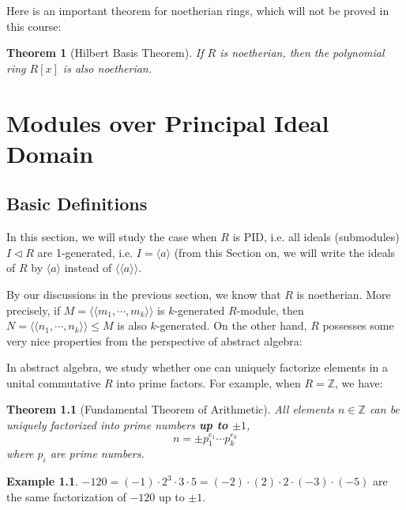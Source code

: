 \documentclass[11pt,openany]{book}
\theoremstyle{plain}
\newtheorem{theorem}{Theorem}[chapter]
\theoremstyle{definition}
\newtheorem{example}[example]{Example}
\theoremstyle{remark}
\begin{document}
Here is an important theorem for noetherian rings, which will not be proved in this course:
\begin{theorem} [Hilbert Basis Theorem]
    If $R$ is noetherian, then the polynomial ring $R[x]$ is also noetherian.
\end{theorem}


\chapter{Modules over Principal Ideal Domain}
\section{Basic Definitions}
In this section, we will study the case when $R$ is PID, i.e. all ideals (submodules) $I\lhd R$ are 1-generated, i.e. $I=\langle a \rangle$ (from this Section on, we will write the ideals of $R$ by $\langle a \rangle$ instead of $\langle \langle a \rangle \rangle$. 

By our discussions in the previous section, we know that $R$ is noetherian. More precisely, if $M=\langle\langle m_1,\cdots,m_k\rangle\rangle$ is $k$-generated $R$-module, then $N=\langle\langle n_1,\cdots,n_k\rangle\rangle\leq M$ is also $k$-generated. On the other hand, $R$ possesses some very nice properties from the perspective of abstract algebra:

In abstract algebra, we study whether one can uniquely factorize elements in a unital commutative $R$ into prime factors. For example, when $R=\mathbb{Z}$, we have:

\begin{theorem} [Fundamental Theorem of Arithmetic]
    All elements $n\in \mathbb{Z}$ can be uniquely factorized into prime numbers {\bf up to $\pm1$},
    $$n= \pm p_1^{e_1}\cdots p_k^{e_k}$$
    where $p_i$ are prime numbers.
\end{theorem}

\begin{example}
    $-120=(-1)\cdot2^3\cdot3\cdot5=(-2)\cdot(2)\cdot2\cdot(-3)\cdot(-5)$ are the same factorization of $-120$ up to $\pm1$.
\end{example}
\end{document}
